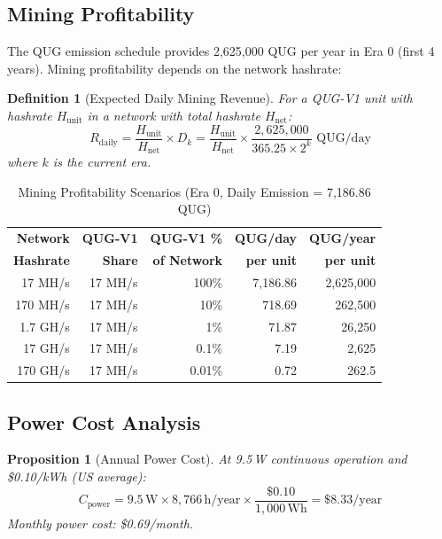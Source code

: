 \documentclass[11pt,a4paper]{article}
\newtheorem{proposition}[theorem]{Proposition}
\newtheorem{definition}[theorem]{Definition}
\begin{document}
\subsection{Mining Profitability}

The QUG emission schedule provides 2,625,000 QUG per year in Era 0 (first 4 years). Mining profitability depends on the network hashrate:

\begin{definition}[Expected Daily Mining Revenue]
For a QUG-V1 unit with hashrate $H_{\text{unit}}$ in a network with total hashrate $H_{\text{net}}$:
\begin{equation}
    R_{\text{daily}} = \frac{H_{\text{unit}}}{H_{\text{net}}} \times D_k = \frac{H_{\text{unit}}}{H_{\text{net}}} \times \frac{2{,}625{,}000}{365.25 \times 2^k} \text{ QUG/day}
\end{equation}
where $k$ is the current era.
\end{definition}

\begin{table}[H]
\centering
\caption{Mining Profitability Scenarios (Era 0, Daily Emission = 7,186.86 QUG)}
\begin{tabular}{@{}rrrrr@{}}
\toprule
\textbf{Network} & \textbf{QUG-V1} & \textbf{QUG-V1 \%} & \textbf{QUG/day} & \textbf{QUG/year} \\
\textbf{Hashrate} & \textbf{Share} & \textbf{of Network} & \textbf{per unit} & \textbf{per unit} \\
\midrule
17 MH/s & 17 MH/s & 100\% & 7,186.86 & 2,625,000 \\
170 MH/s & 17 MH/s & 10\% & 718.69 & 262,500 \\
1.7 GH/s & 17 MH/s & 1\% & 71.87 & 26,250 \\
17 GH/s & 17 MH/s & 0.1\% & 7.19 & 2,625 \\
170 GH/s & 17 MH/s & 0.01\% & 0.72 & 262.5 \\
\bottomrule
\end{tabular}
\end{table}

\subsection{Power Cost Analysis}

\begin{proposition}[Annual Power Cost]
At 9.5\,W continuous operation and \$0.10/kWh (US average):
\begin{equation}
    C_{\text{power}} = 9.5\,\text{W} \times 8{,}766\,\text{h/year} \times \frac{\$0.10}{1{,}000\,\text{Wh}} = \$8.33\text{/year}
\end{equation}
Monthly power cost: \$0.69/month.
\end{proposition}
\end{document}
